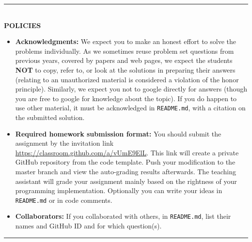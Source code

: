 \vspace{3em}

\rule{\textwidth}{1pt}
\\
\textbf{POLICIES}
\begin{itemize}
\item {\bf Acknowledgments: \/} 
  We expect you to make an honest effort to solve the problems individually.  As we sometimes reuse problem set questions from previous years, covered by papers and web pages, we expect the students \textbf{NOT} to copy, refer to, or look at the solutions in preparing their answers (relating to an unauthorized material is considered a violation of the honor principle). Similarly, we expect you not to google directly for answers (though you are free to google for knowledge about the topic). If you do happen to use other material, it must be acknowledged in \texttt{README.md}, with a citation on the submitted solution.
  
\item {\bf Required homework submission format: \/} 
  You should submit the assignment by the invitation link \url{https://classroom.github.com/a/vUmE9ElL}. This link will create a private GitHub repository from the code template.
  Push your modification to the master branch and view the auto-grading results afterwards. The teaching assistant will grade your
  assignment mainly based on the rightness of your programming implementation.
  Optionally you can write your ideas in \texttt{README.md} or in code comments.
  

\item {\bf Collaborators: \/}
If you collaborated with others, in \texttt{README.md}, list their names and GitHub ID and for which question(s).
\end{itemize}
\rule{\textwidth}{1pt}
